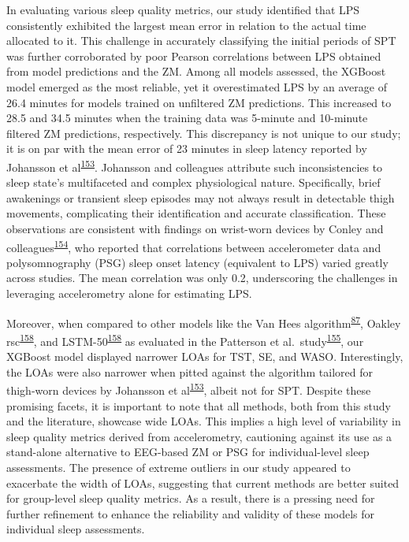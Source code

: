 \documentclass[
  9pt,
]{scrbook}
\begin{document}
In evaluating various sleep quality metrics, our study identified that
LPS consistently exhibited the largest mean error in relation to the
actual time allocated to it. This challenge in accurately classifying
the initial periods of SPT was further corroborated by poor Pearson
correlations between LPS obtained from model predictions and the ZM.
Among all models assessed, the XGBoost model emerged as the most
reliable, yet it overestimated LPS by an average of 26.4 minutes for
models trained on unfiltered ZM predictions. This increased to 28.5 and
34.5 minutes when the training data was 5-minute and 10-minute filtered
ZM predictions, respectively. This discrepancy is not unique to our
study; it is on par with the mean error of 23 minutes in sleep latency
reported by Johansson et
al\textsuperscript{\protect\hyperlink{ref-johansson_development_2023}{153}}.
Johansson and colleagues attribute such inconsistencies to sleep state's
multifaceted and complex physiological nature. Specifically, brief
awakenings or transient sleep episodes may not always result in
detectable thigh movements, complicating their identification and
accurate classification. These observations are consistent with findings
on wrist-worn devices by Conley and
colleagues\textsuperscript{\protect\hyperlink{ref-conley_agreement_2019}{154}},
who reported that correlations between accelerometer data and
polysomnography (PSG) sleep onset latency (equivalent to LPS) varied
greatly across studies. The mean correlation was only 0.2, underscoring
the challenges in leveraging accelerometry alone for estimating LPS.

Moreover, when compared to other models like the Van Hees
algorithm\textsuperscript{\protect\hyperlink{ref-hees_novel_2015}{87}},
Oakley
rsc\textsuperscript{\protect\hyperlink{ref-palotti_benchmark_2019}{158}},
and
LSTM-50\textsuperscript{\protect\hyperlink{ref-palotti_benchmark_2019}{158}}
as evaluated in the Patterson et
al.~study\textsuperscript{\protect\hyperlink{ref-patterson_40_2023}{155}},
our XGBoost model displayed narrower LOAs for TST, SE, and WASO.
Interestingly, the LOAs were also narrower when pitted against the
algorithm tailored for thigh-worn devices by Johansson et
al\textsuperscript{\protect\hyperlink{ref-johansson_development_2023}{153}},
albeit not for SPT. Despite these promising facets, it is important to
note that all methods, both from this study and the literature, showcase
wide LOAs. This implies a high level of variability in sleep quality
metrics derived from accelerometry, cautioning against its use as a
stand-alone alternative to EEG-based ZM or PSG for individual-level
sleep assessments. The presence of extreme outliers in our study
appeared to exacerbate the width of LOAs, suggesting that current
methods are better suited for group-level sleep quality metrics. As a
result, there is a pressing need for further refinement to enhance the
reliability and validity of these models for individual sleep
assessments.
\end{document}
